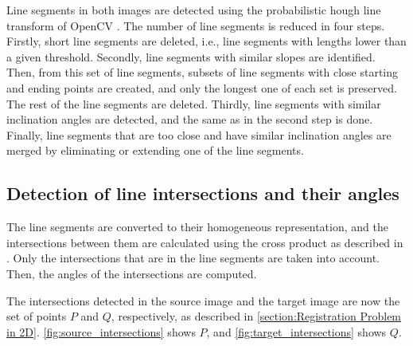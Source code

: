             Line segments in both images are detected using the probabilistic hough line transform of OpenCV \cite{opencv_library}.
            The number of line segments is reduced in four steps. 
            Firstly, short line segments are deleted, i.e., line segments with lengths lower than a given threshold.
            Secondly, line segments with similar slopes are identified. 
            Then, from this set of line segments, subsets of line segments with close starting and ending points are created,
            and only the longest one of each set is preserved. The rest of the line segments are deleted.
            Thirdly, line segments with similar inclination angles are detected, and the same as in the second step is done.
            Finally, line segments that are too close and have similar inclination angles are merged by eliminating or extending one of the line segments.

        \subsection{Detection of line intersections and their angles}
        \label{sub:Detection of line intersections and their angles}
        
            The line segments are converted to their homogeneous representation, 
            and the intersections between them are calculated using the cross product as described in \cite{Hartley_2003_multiple_Book}.
            Only the intersections that are in the line segments are taken into account.
            Then, the angles of the intersections are computed.

            The intersections detected in the source image and the target image are now the set of points $P$ and $Q$, respectively, 
            as described in \autoref{section:Registration Problem in 2D}. 
            \autoref{fig:source_intersections} shows $P$, and \autoref{fig:target_intersections} shows $Q$.

